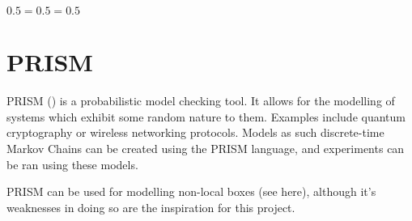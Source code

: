 \documentclass[report.tex]{subfiles}
\begin{document}
\(0.5 = 0.5 = 0.5\)




\section{PRISM} %
\label{sec:prism}
PRISM (\cite{KNP11}) is a probabilistic model checking tool. It allows for
the modelling of systems which exhibit some random nature to them. Examples
include quantum cryptography or wireless networking protocols. Models as such
discrete-time Markov Chains can be created using the PRISM language, and
experiments can be ran using these models.

PRISM can be used for modelling non-local boxes (see here), although it's
weaknesses in doing so are the inspiration for this project.

\newpage
\end{document}
